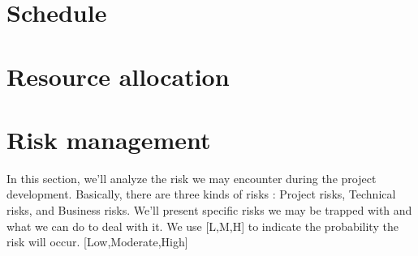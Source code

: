 \documentclass{article}
\begin{document}
\section{Schedule}

\newpage

\section{Resource allocation}

\newpage

\section{Risk management}
In this section, we'll analyze the risk we may encounter during the project development. Basically, there are three kinds of risks : Project risks, Technical risks, and Business risks. We'll present specific risks we may be trapped with and what we can do to deal with it. We use [L,M,H] to indicate the probability the risk will occur. [Low,Moderate,High]\\
\end{document}
